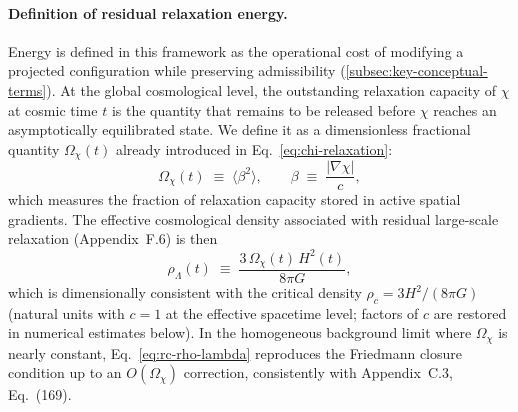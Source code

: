     \paragraph{Definition of residual relaxation energy.}
      Energy is defined in this framework as the operational cost of modifying
      a projected configuration while preserving admissibility (\ref{subsec:key-conceptual-terms}).
      At the global cosmological level, the outstanding relaxation capacity
      of $\chi$ at cosmic time $t$ is the quantity that remains to be
      released before $\chi$ reaches an asymptotically equilibrated state.
      We define it as a dimensionless fractional quantity $\Omega_\chi(t)$
      already introduced in Eq.~\eqref{eq:chi-relaxation}:
    \begin{equation}
      \label{eq:rc-omega}
      \Omega_\chi(t) \;\equiv\; \langle \beta^2 \rangle,
      \qquad
      \beta \;\equiv\; \frac{|\nabla\chi|}{c},
      \end{equation}
      which measures the fraction of relaxation capacity stored in active
      spatial gradients.
      The effective cosmological density associated with residual large-scale
      relaxation (Appendix~F.6) is then
    \begin{equation}
      \label{eq:rc-rho-lambda}
      \rho_{\Lambda}(t)
      \;\equiv\;
      \frac{3\,\Omega_\chi(t)\,H^2(t)}{8\pi G},
      \end{equation}
      which is dimensionally consistent with the critical density
      $\rho_c = 3H^2/(8\pi G)$ (natural units with $c=1$ at the effective
      spacetime level; factors of $c$ are restored in numerical estimates
      below).
      In the homogeneous background limit where $\Omega_\chi$ is nearly
      constant, Eq.~\eqref{eq:rc-rho-lambda} reproduces the Friedmann
      closure condition up to an $O(\Omega_\chi)$ correction, consistently
      with Appendix~C.3, Eq.~(169).

